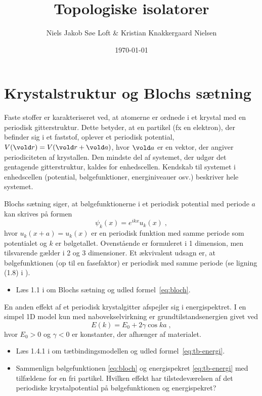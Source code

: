 \documentclass[11pt, a4paper]{article}
\let\v\vold
\newcommand{\v}[1]{{\bf{#1}}}
\begin{document}
\title{Topologiske isolatorer}
\date{\today}

\author{Niels Jakob Søe Loft \& Kristian Knakkergaard Nielsen}

\maketitle


\section{Krystalstruktur og Blochs sætning}

Faste stoffer er karakteriseret ved, at atomerne er ordnede i et
krystal med en periodisk gitterstruktur. Dette betyder, at en partikel
(fx en elektron), der befinder sig i et faststof, oplever et periodisk
potential, $V(\v r) = V(\v r + \v a)$, hvor $\v a$ er en vektor, der
angiver periodiciteten af krystallen. Den mindste del af systemet, der
udgør det gentagende gitterstruktur, kaldes for enhedscellen. Kendskab
til systemet i enhedscellen (potential, bølgefunktioner,
energiniveauer osv.) beskriver hele systemet. 

Blochs sætning siger, at bølgefunktionerne i et periodisk potential med
periode $a$ kan skrives på formen
\begin{equation}
  \label{eq:bloch}
  \psi_k(x) = e^{ikx} u_k(x) \; ,
\end{equation}
hvor $u_k(x+a) = u_k(x)$ er en periodisk funktion med samme periode
som potentialet og $k$ er bølgetallet. Ovenstående er formuleret i 1 
dimension, men tilsvarende gælder i 2 og 3 dimensioner. Et ækvivalent 
udsagn er, at bølgefunktionen (op til en fasefaktor) er periodisk med 
samme periode (se ligning (1.8) i \cite{gp}).

\begin{itemize}
\item Læs 1.1 i \cite{gp} om Blochs sætning og udled formel~\eqref{eq:bloch}.
\end{itemize}

En anden effekt af et periodisk krystalgitter afspejler sig i
energispektret. I en simpel 1D model kun med nabovekselvirkning er
grundtilstandsenergien givet ved
\begin{equation}
  \label{eq:tb-energi}
  E(k) = E_0 + 2 \gamma \cos ka \; ,
\end{equation}
hvor $E_0 > 0$ og $\gamma < 0$ er konstanter, der afhænger af
materialet.

\begin{itemize}
\item Læs 1.4.1 i \cite{gp} om tætbindingsmodellen og udled
  formel~\eqref{eq:tb-energi}.
\item Sammenlign bølgefunktionen \eqref{eq:bloch} og energispekret
  \eqref{eq:tb-energi} med tilfældene for en fri partikel. Hvilken
  effekt har tilstedeværelsen af det periodiske krystalpotential på
  bølgefunktionen og energispekret?
\end{itemize}
\end{document}
